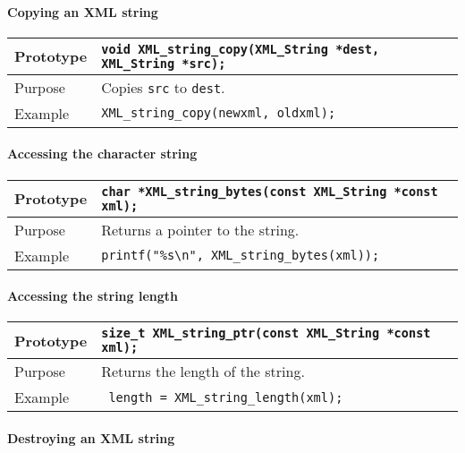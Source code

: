 \documentclass{article}
\begin{document}
\paragraph{Copying an XML string}

\begin{flushleft}
  \begin{tabular}{|l|l|}
  \hline
  Prototype      & \verb|void XML_string_copy(XML_String *dest, XML_String *src);|\\
    \hline
  Purpose        & Copies \verb|src| to \verb|dest|. \\
   \hline
  Example        & \verb|XML_string_copy(newxml, oldxml);| \\
   \hline
 \end{tabular}
\end{flushleft}
%
\paragraph{Accessing the character string}

\begin{flushleft}
  \begin{tabular}{|l|l|}
  \hline
  Prototype      & \verb|char *XML_string_bytes(const XML_String *const xml);|\\
    \hline
  Purpose        & Returns a pointer to the string. \\
   \hline
  Example        & \verb|printf("%s\n", XML_string_bytes(xml));| \\
   \hline
 \end{tabular}
\end{flushleft}
%
\paragraph{Accessing the string length}

\begin{flushleft}
  \begin{tabular}{|l|l|}
  \hline
  Prototype      & \verb|size_t XML_string_ptr(const XML_String *const xml);|\\
    \hline
  Purpose        & Returns the length of the string. \\
   \hline
  Example        & \verb| length = XML_string_length(xml);| \\
   \hline
 \end{tabular}
\end{flushleft}
%
\paragraph{Destroying an XML string}
\end{document}
